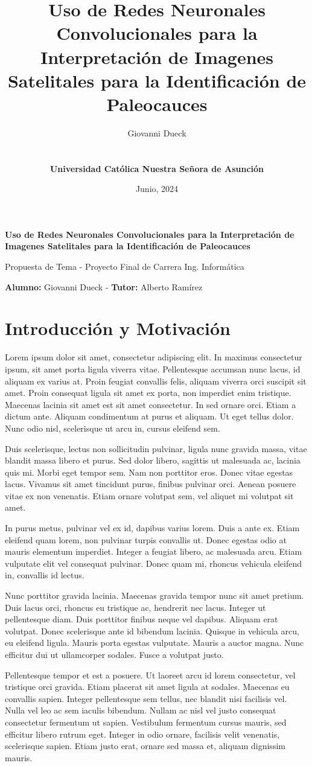 \documentclass[a4paper, 11pt]{article}
\title{Uso de Redes Neuronales Convolucionales para la Interpretación de Imagenes Satelitales para la Identificación de Paleocauces}
\author{Giovanni Dueck\\\UrlFont{giodueck@gmail.com}\\\\{\bf Universidad Católica Nuestra Señora de Asunción}}
\date{Junio, 2024}
\begin{document}
\begin{center}
    \Large{\bf Uso de Redes Neuronales Convolucionales para la Interpretación de Imagenes Satelitales para la Identificación de Paleocauces}

    Propuesta de Tema - Proyecto Final de Carrera Ing. Informática

    {\bf Alumno:} Giovanni Dueck - {\bf Tutor:} Alberto Ramírez
\end{center}

\section*{Introducción y Motivación}

Lorem ipsum dolor sit amet, consectetur adipiscing elit. In maximus consectetur ipsum, sit amet porta ligula viverra vitae. Pellentesque accumsan nunc lacus, id aliquam ex varius at. Proin feugiat convallis felis, aliquam viverra orci suscipit sit amet. Proin consequat ligula sit amet ex porta, non imperdiet enim tristique. Maecenas lacinia sit amet est sit amet consectetur. In sed ornare orci. Etiam a dictum ante. Aliquam condimentum at purus et aliquam. Ut eget tellus dolor. Nunc odio nisl, scelerisque ut arcu in, cursus eleifend sem.

Duis scelerisque, lectus non sollicitudin pulvinar, ligula nunc gravida massa, vitae blandit massa libero et purus. Sed dolor libero, sagittis ut malesuada ac, lacinia quis mi. Morbi eget tempor sem. Nam non porttitor eros. Donec vitae egestas lacus. Vivamus sit amet tincidunt purus, finibus pulvinar orci. Aenean posuere vitae ex non venenatis. Etiam ornare volutpat sem, vel aliquet mi volutpat sit amet.

In purus metus, pulvinar vel ex id, dapibus varius lorem. Duis a ante ex. Etiam eleifend quam lorem, non pulvinar turpis convallis ut. Donec egestas odio at mauris elementum imperdiet. Integer a feugiat libero, ac malesuada arcu. Etiam vulputate elit vel consequat pulvinar. Donec quam mi, rhoncus vehicula eleifend in, convallis id lectus.

Nunc porttitor gravida lacinia. Maecenas gravida tempor nunc sit amet pretium. Duis lacus orci, rhoncus eu tristique ac, hendrerit nec lacus. Integer ut pellentesque diam. Duis porttitor finibus neque vel dapibus. Aliquam erat volutpat. Donec scelerisque ante id bibendum lacinia. Quisque in vehicula arcu, eu eleifend ligula. Mauris porta egestas vulputate. Mauris a auctor magna. Nunc efficitur dui ut ullamcorper sodales. Fusce a volutpat justo.

Pellentesque tempor et est a posuere. Ut laoreet arcu id lorem consectetur, vel tristique orci gravida. Etiam placerat sit amet ligula at sodales. Maecenas eu convallis sapien. Integer pellentesque sem tellus, nec blandit nisi facilisis vel. Nulla vel leo ac sem iaculis bibendum. Nullam ac nisl vel justo consequat consectetur fermentum ut sapien. Vestibulum fermentum cursus mauris, sed efficitur libero rutrum eget. Integer in odio ornare, facilisis velit venenatis, scelerisque sapien. Etiam justo erat, ornare sed massa et, aliquam dignissim mauris. 
\end{document}

